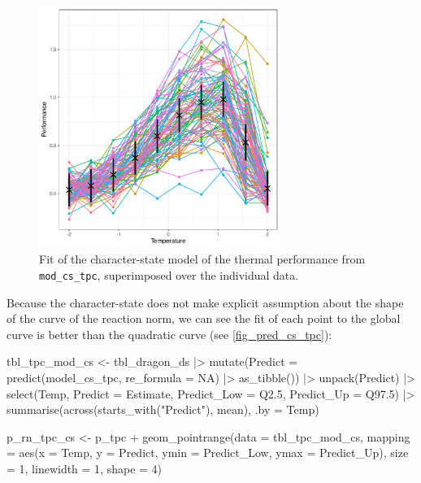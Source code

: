 \documentclass[a4paper,12pt,twoside]{article}
\begin{document}
\begin{figure}[b!h!]
  \includegraphics[width = 0.7\textwidth]{TPC_discrete_cs_pred.pdf}
  \caption{Fit of the character-state model of the thermal performance from \texttt{mod\_cs\_tpc}, superimposed over the individual data.}
  \label{fig_pred_cs_tpc}
\end{figure}

Because the character-state does not make explicit assumption about the shape of the curve of the reaction norm, we can see the fit of each point to the global curve is better than the quadratic curve (see \autoref{fig_pred_cs_tpc}):
\begin{Rinput}
tbl_tpc_mod_cs <-
    tbl_dragon_ds |>
    mutate(Predict = predict(model_cs_tpc, re_formula = NA) |>
                     as_tibble()) |>
    unpack(Predict) |>
    select(Temp,
           Predict = Estimate,
           Predict_Low = Q2.5,
           Predict_Up  = Q97.5) |>
    summarise(across(starts_with("Predict"), mean),
              .by = Temp)

p_rn_tpc_cs <-
    p_tpc +
    geom_pointrange(data = tbl_tpc_mod_cs,
                    mapping = aes(x = Temp, y = Predict, ymin = Predict_Low, ymax = Predict_Up),
                    size = 1, linewidth = 1, shape = 4)
\end{Rinput}
\end{document}
